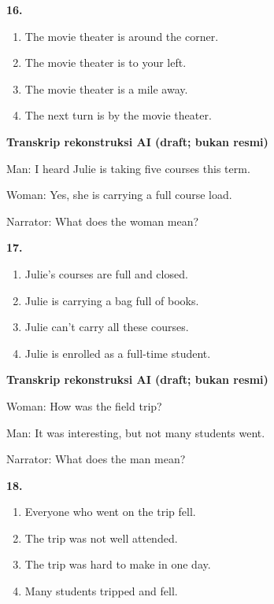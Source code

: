 \documentclass[12pt]{article}
\begin{document}
\noindent\textbf{16.}
\begin{enumerate}[label=(\Alph*),leftmargin=*,itemsep=0.2em]
\item The movie theater is around the corner.
\item The movie theater is to your left.
\item The movie theater is a mile away.
\item The next turn is by the movie theater.
\end{enumerate}
\par
\vspace{0.25\baselineskip}
\begin{exampleblock}
\textbf{Transkrip rekonstruksi AI (draft; bukan resmi)}\par
Man: I heard Julie is taking five courses this term.\par
Woman: Yes, she is carrying a full course load.\par
Narrator: What does the woman mean?\par
\end{exampleblock}
\noindent\textbf{17.}
\begin{enumerate}[label=(\Alph*),leftmargin=*,itemsep=0.2em]
\item Julie's courses are full and closed.
\item Julie is carrying a bag full of books.
\item Julie can't carry all these courses.
\item Julie is enrolled as a full-time student.
\end{enumerate}
\par
\vspace{0.25\baselineskip}
\begin{exampleblock}
\textbf{Transkrip rekonstruksi AI (draft; bukan resmi)}\par
Woman: How was the field trip?\par
Man: It was interesting, but not many students went.\par
Narrator: What does the man mean?\par
\end{exampleblock}
\noindent\textbf{18.}
\begin{enumerate}[label=(\Alph*),leftmargin=*,itemsep=0.2em]
\item Everyone who went on the trip fell.
\item The trip was not well attended.
\item The trip was hard to make in one day.
\item Many students tripped and fell.
\end{enumerate}
\end{document}
